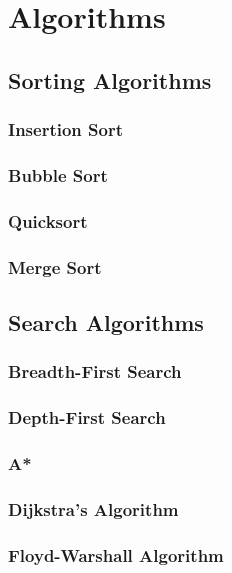 \chapter{Algorithms}


\section{Sorting Algorithms}


\subsection{Insertion Sort}


\subsection{Bubble Sort}


\subsection{Quicksort}


\subsection{Merge Sort}


\section{Search Algorithms}


\subsection{Breadth-First Search}


\subsection{Depth-First Search}


\subsection{A*}


\subsection{Dijkstra's Algorithm}


\subsection{Floyd-Warshall Algorithm}
